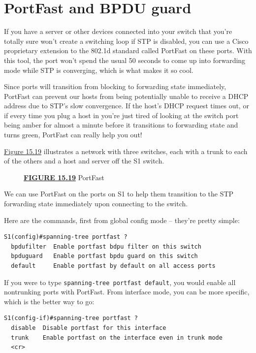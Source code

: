 \section{PortFast and BPDU guard}

If you have a server or other devices connected into your switch that
you're totally sure won't create a switching loop if STP is disabled,
you can use a Cisco proprietary extension to the 802.1d standard called
PortFast on these ports. With this tool, the port won't spend
the usual 50 seconds
to come up into forwarding mode while STP is converging, which is what
makes it so cool.

Since ports will transition from blocking to forwarding state
immediately, PortFast can prevent our hosts from being potentially
unable to receive a DHCP address due to STP's slow convergence. If the
host's DHCP request times out, or if every time you plug a host in
you're just tired of looking at the switch port being amber for almost a
minute before it transitions to forwarding state and turns green,
PortFast can really help you out!

\protect\hyperlink{c15.xhtmlux5cux23figure15-19}{Figure 15.19}
illustrates a network with three switches, each with a trunk to each of
the others and a host and server off the S1 switch.

\begin{figure}
\centering
\caption{{\protect\hyperlink{c15.xhtmlux5cux23figureanchor15-19}{\textbf{FIGURE
15.19}} PortFast}}
\end{figure}

We can use PortFast on the ports on S1 to help them transition to the
STP forwarding state immediately upon connecting to the switch.

Here are the commands, first from global config mode -- they're pretty
simple:

\begin{verbatim}
S1(config)#spanning-tree portfast ?
  bpdufilter  Enable portfast bdpu filter on this switch
  bpduguard   Enable portfast bpdu guard on this switch
  default     Enable portfast by default on all access ports
\end{verbatim}

If you were to type \texttt{spanning-tree\ portfast\ default}, you would
enable all nontrunking ports with PortFast. From interface mode, you can
be more specific, which is the better way to go:

\begin{verbatim}
S1(config-if)#spanning-tree portfast ?
  disable  Disable portfast for this interface
  trunk    Enable portfast on the interface even in trunk mode
  <cr>
\end{verbatim}

